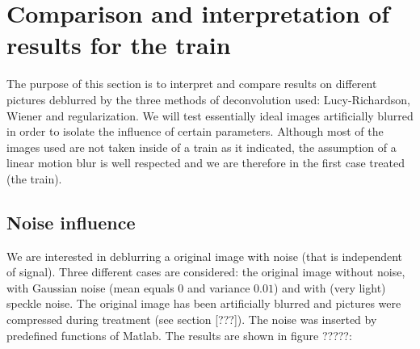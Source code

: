 
\section{Comparison and interpretation of results for the train}

The purpose of this section is to interpret and compare results on different pictures deblurred by the three methods of deconvolution used: Lucy-Richardson, Wiener and regularization. We will test essentially ideal images artificially blurred in order to isolate the influence of certain parameters. Although most of the images used are not taken inside of a train as it indicated, the assumption of a linear motion blur is well respected and we are therefore in the first case treated (the train).

\subsection{Noise influence}

We are interested in deblurring a original image with noise (that is independent of signal). Three different cases are considered: the original image without noise, with Gaussian noise (mean equals $0$ and variance $0.01$) and with (very light) speckle noise. The original image has been artificially blurred and pictures were compressed during treatment (see section [???]). The noise was inserted by predefined functions of Matlab. The results are shown in figure ?????:

